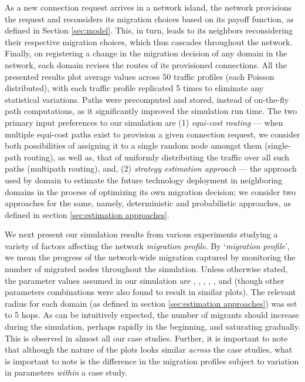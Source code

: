 \documentclass[smallextended]{svjour3}
\begin{document}
\par As a new connection request arrives in a network island, the network
provisions the request and reconsiders its migration choices based on its payoff
function, as defined in Section \ref{sec:model}. This, in turn, leads to its
neighbors reconsidering their respective migration choices, which thus cascades
throughout the network. Finally, on registering a change in the migration
decision of any domain in the network, each domain revises the routes of its
provisioned connections. All the presented results plot average values across 50
traffic profiles (each Poisson distributed), with each traffic profile
replicated 5 times to eliminate any statistical variations.
Paths were precomputed and stored, instead of on-the-fly path computations, as
it significantly improved the simulation run time. The two primary input
preferences to our simulation are (1) \emph{equi-cost routing} ---
when multiple equi-cost paths exist to provision a given connection request, we
consider both possibilities of assigning it to a single random node amongst
them (single-path routing), as well as, that of uniformly distributing the
traffic over all such paths (multipath routing), and, (2) \emph{strategy
estimation approach} --- the approach used by domain to estimate the future
technology deployment in neighboring domains in the process of optimizing its own migration decision; we consider
two approaches for the same, namely, deterministic and probabilistic
approaches, as defined in section \ref{sec:estimation approaches}.

\par We next present our simulation results from various experiments
studying a variety of factors affecting the network \emph{migration profile}.
By `\emph{migration profile}', we mean the progress of the network-wide
migration captured by monitoring the number of migrated nodes throughout the
simulation.
Unless otherwise stated, the parameter values assumed in our simulation are , ,
, , ,
 and
 (though other parameters combinations
were also found to result in similar plots).
The relevant radius for each domain (as defined in section \ref{sec:estimation
approaches}) was set to 5 hops. As can be intuitively expected, the
number of migrants should increase during the simulation, perhaps rapidly in the
beginning, and saturating gradually. This is observed in almost all our case
studies. Further, it is important to note that although the nature of the plots
looks similar \emph{across} the case studies, what is important to note is the
difference in the migration profiles subject to variation in parameters \emph{within}
a case study.
\end{document}
